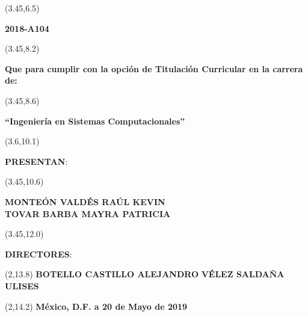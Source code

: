 	\begin{textblock}{12}(3.45,6.5)
		\begin{center} \Large{\textbf{2018-A104}} \end{center}
	\end{textblock}
	
	\begin{textblock}{12}(3.45,8.2)
		\begin{center} \normalsize{\bf{Que para cumplir con la opción de Titulación Curricular en la carrera de:}} \end{center}
	\end{textblock}
	
	\begin{textblock}{12}(3.45,8.6)
		\begin{center} \large{\textbf{“Ingeniería en Sistemas Computacionales”}}\end{center}
	\end{textblock}
	
	\begin{textblock}{12}(3.6,10.1)
		\begin{center} \textbf{PRESENTAN}: \end{center}
	\end{textblock}
	
	\begin{textblock}{12}(3.45,10.6)
		\begin{center} \Large{\textbf{MONTEÓN VALDÉS RAÚL KEVIN \\ TOVAR BARBA MAYRA PATRICIA}} \end{center}
	\end{textblock}
	
	\begin{textblock}{12}(3.45,12.0)
		\begin{center} \textbf{DIRECTORES}: \end{center}
	\end{textblock}
	
	\begin{textblock}{30}(2,13.8)
		 \textbf{BOTELLO CASTILLO ALEJANDRO }\hspace{1in} \textbf{VÉLEZ SALDAÑA ULISES }
	\end{textblock}
	\begin{textblock}{12}(2,14.2)
		\raggedleft	\textbf{México, D.F. a 20 de Mayo de 2019}
	\end{textblock}
	\newpage 